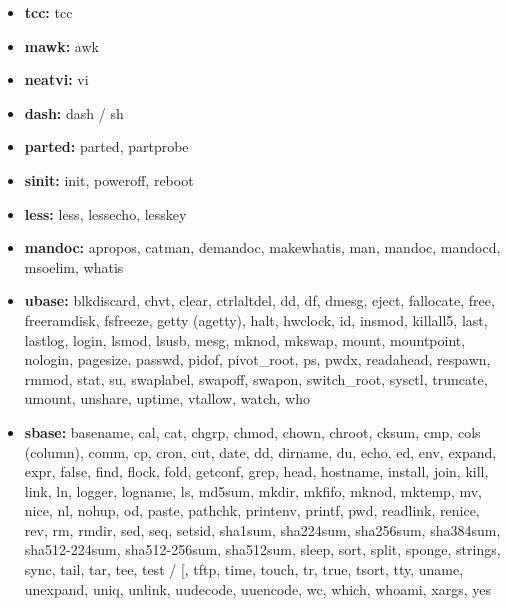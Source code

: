 \begin{itemize}
    \item \textbf{tcc:} tcc
    \item \textbf{mawk:} awk
    \item \textbf{neatvi:} vi
    \item \textbf{dash:} dash / sh
    \item \textbf{parted:} parted, partprobe
    \item \textbf{sinit:} init, poweroff, reboot
    \item \textbf{less:} less, lessecho, lesskey
    \item \textbf{mandoc:} apropos, catman, demandoc, makewhatis, man, mandoc, mandocd, msoelim, whatis
    \item \textbf{ubase:} blkdiscard, chvt, clear, ctrlaltdel, dd, df, dmesg, eject, fallocate, free, freeramdisk, fsfreeze, getty (agetty), halt, hwclock, id, insmod, killall5, last, lastlog, login, lsmod, lsusb, mesg, mknod, mkswap, mount, mountpoint, nologin, pagesize, passwd, pidof, pivot\_root, ps, pwdx, readahead, respawn, rmmod, stat, su, swaplabel, swapoff, swapon, switch\_root, sysctl, truncate, umount, unshare, uptime, vtallow, watch, who
    \item \textbf{sbase:} basename, cal, cat, chgrp, chmod, chown, chroot, cksum, cmp, cols (column), comm, cp, cron, cut, date, dd, dirname, du, echo, ed, env, expand, expr, false, find, flock, fold, getconf, grep, head, hostname, install, join, kill, link, ln, logger, logname, ls, md5sum, mkdir, mkfifo, mknod, mktemp, mv, nice, nl, nohup, od, paste, pathchk, printenv, printf, pwd, readlink, renice, rev, rm, rmdir, sed, seq, setsid, sha1sum, sha224sum, sha256sum, sha384sum, sha512-224sum, sha512-256sum, sha512sum, sleep, sort, split, sponge, strings, sync, tail, tar, tee, test / [, tftp, time, touch, tr, true, tsort, tty, uname, unexpand, uniq, unlink, uudecode, uuencode, wc, which, whoami, xargs, yes
\end{itemize}
